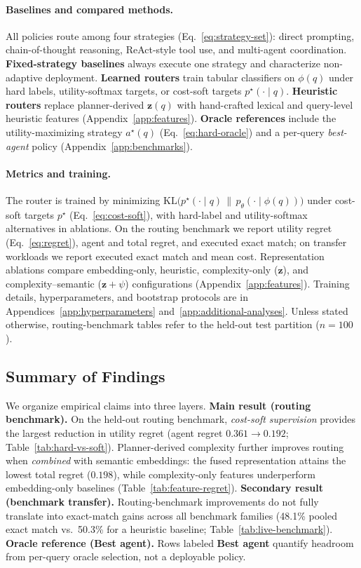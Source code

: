\paragraph{Baselines and compared methods.}
All policies route among four strategies
(Eq.~\ref{eq:strategy-set}): direct prompting, chain-of-thought reasoning, ReAct-style tool
use, and multi-agent coordination.
\textbf{Fixed-strategy baselines} always execute one strategy and characterize non-adaptive
deployment.
\textbf{Learned routers} train tabular classifiers on $\phi(q)$ under hard labels,
utility-softmax targets, or cost-soft targets $p^\star(\cdot\mid q)$.
\textbf{Heuristic routers} replace planner-derived $\mathbf{z}(q)$ with hand-crafted lexical
and query-level heuristic features (Appendix~\ref{app:features}).
\textbf{Oracle references} include the utility-maximizing strategy $a^\star(q)$
(Eq.~\ref{eq:hard-oracle}) and a per-query \emph{best-agent} policy (Appendix~\ref{app:benchmarks}).

\paragraph{Metrics and training.}
The router is trained by minimizing
$\mathrm{KL}\!\bigl(p^\star(\cdot\mid q)\,\|\,p_\theta(\cdot\mid\phi(q))\bigr)$
under cost-soft targets $p^\star$ (Eq.~\ref{eq:cost-soft}), with hard-label and utility-softmax
alternatives in ablations.
On the routing benchmark we report utility regret (Eq.~\ref{eq:regret}), agent and total regret,
and executed exact match; on transfer workloads we report executed exact match and mean cost.
Representation ablations compare embedding-only, heuristic, complexity-only ($\mathbf{z}$), and
complexity--semantic ($\mathbf{z}+\psi$) configurations (Appendix~\ref{app:features}).
Training details, hyperparameters, and bootstrap protocols are in
Appendices~\ref{app:hyperparameters} and~\ref{app:additional-analyses}.
Unless stated otherwise, routing-benchmark tables refer to the held-out test partition ($n{=}100$).

\subsection{Summary of Findings}
\label{sec:results-overview}

We organize empirical claims into three layers.
\textbf{Main result (routing benchmark).}
On the held-out routing benchmark, \emph{cost-soft supervision} provides the largest reduction
in utility regret (agent regret $0.361\to 0.192$; Table~\ref{tab:hard-vs-soft}).
Planner-derived complexity further improves routing when \emph{combined} with semantic
embeddings: the fused representation attains the lowest total regret ($0.198$), while
complexity-only features underperform embedding-only baselines
(Table~\ref{tab:feature-regret}).
\textbf{Secondary result (benchmark transfer).}
Routing-benchmark improvements do not fully translate into exact-match gains across all
benchmark families (48.1\% pooled exact match vs.\ 50.3\% for a heuristic baseline;
Table~\ref{tab:live-benchmark}).
\textbf{Oracle reference (Best agent).}
Rows labeled \textbf{Best agent} quantify headroom from per-query oracle selection, not a
deployable policy.

